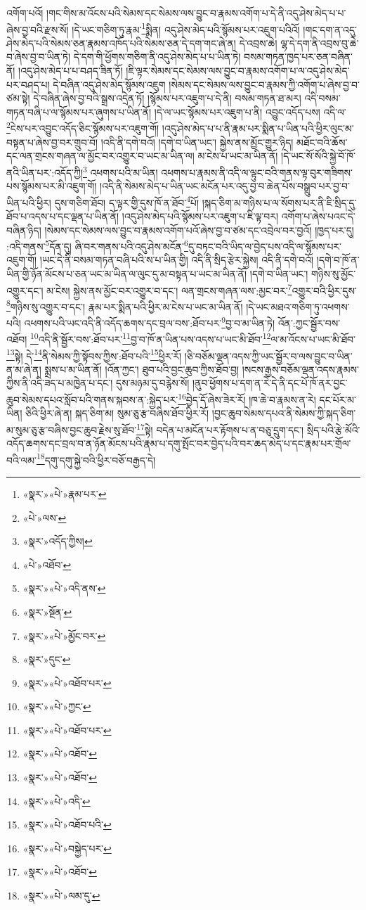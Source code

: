 འགོག་པའོ། །གང་གིས་མ་འོངས་པའི་སེམས་དང་སེམས་ལས་བྱུང་བ་རྣམས་འགོག་པ་དེ་ནི་འདུ་ཤེས་མེད་པ་པ་ཞེས་བྱ་བའི་རྫས་སོ། །དེ་ཡང་གཅིག་ཏུ་རྣམ་\footnote{«སྣར་»«པེ་»རྣམ་པར་}སྨིན། འདུ་ཤེས་མེད་པའི་སྙོམས་པར་འཇུག་པའིའོ། །གང་དག་ན་འདུ་ཤེས་མེད་པའི་སེམས་ཅན་རྣམས་འཁོད་པའི་སེམས་ཅན་དེ་དག་གང་ཞེ་ན། དེ་འབྲས་ཆེ། ལྷ་དེ་དག་ནི་འབྲས་བུ་ཆེ་བ་ཞེས་བྱ་བ་ཡིན་ཏེ། དེ་དག་གི་ཕྱོགས་གཅིག་ནི་འདུ་ཤེས་མེད་པ་པ་ཡིན་ཏེ། བསམ་གཏན་ཁྱད་པར་ཅན་བཞིན་ནོ། །འདུ་ཤེས་མེད་པ་པ་བཤད་ཟིན་ཏོ། །ཇི་ལྟར་སེམས་དང་སེམས་ལས་བྱུང་བ་རྣམས་འགོག་པ་ལ་འདུ་ཤེས་མེད་པར་བཤད་པ། དེ་བཞིན་འདུ་ཤེས་མེད་སྙོམས་འཇུག །སེམས་དང་སེམས་ལས་བྱུང་བ་རྣམས་ཀྱི་འགོག་པ་ཞེས་བྱ་བ་ཙམ་སྟེ། དེ་བཞིན་ཞེས་བྱ་བའི་སྒྲས་འདྲེན་ཏོ། །སྙོམས་པར་འཇུག་པ་དེ་ནི། བསམ་གཏན་ཐ་མར། འདི་བསམ་གཏན་བཞི་པ་ལ་སྙོམས་པར་ཞུགས་པ་ཡིན་ནོ། །དེ་ལ་ཡང་སྙོམས་པར་འཇུག་པ་ནི། འབྱུང་འདོད་པས། འདི་ལ་\footnote{«པེ་»ལས་}ངེས་པར་འབྱུང་འདོད་ཅིང་སྙོམས་པར་འཇུག་གོ། །འདུ་ཤེས་མེད་པ་པ་ནི་རྣམ་པར་སྨིན་པ་ཡིན་པའི་ཕྱིར་ལུང་མ་བསྟན་པ་ཞེས་བྱ་བར་གྲུབ་བོ། །འདི་ནི་དགེ་བའོ། །དགེ་བ་ཡིན་ཡང་། སྐྱེས་ནས་མྱོང་གྱུར་ཉིད། མཐོང་བའི་ཆོས་དང་ལན་གྲངས་གཞན་ལ་མྱོང་བར་འགྱུར་བ་ཡང་མ་ཡིན་ལ། མ་ངེས་པ་ཡང་མ་ཡིན་ནོ། །དེ་ཡང་སོ་སོའི་སྐྱེ་བོ་ཁོ་ནའི་ཡིན་པར་:འདོད་ཀྱི།\footnote{«སྣར་»འདོད་ཀྱིས།} འཕགས་པའི་མ་ཡིན། འཕགས་པ་རྣམས་ནི་འདི་ལ་ལྟུང་བའི་གནས་ལྟ་བུར་གཟིགས་པས་སྙོམས་པར་མི་འཇུག་གོ། །འདི་ནི་སེམས་མེད་པ་ཡིན་ཡང་མངོན་པར་འདུ་བྱ་བ་ཆེན་པོས་བསྒྲུབ་པར་བྱ་བ་ཡིན་པའི་ཕྱིར། དུས་གཅིག་ཐོབ། ད་ལྟར་གྱི་དུས་ཁོ་ན་ཐོབ་\footnote{«པེ་»འཐོབ་}པོ། །སྐད་ཅིག་མ་གཉིས་པ་ལ་སོགས་པར་ནི་ཇི་སྲིད་དུ་ཐོབ་པ་འདས་པ་དང་ལྡན་པ་ཡིན་ནོ། །འདུ་ཤེས་མེད་པའི་སྙོམས་པར་འཇུག་པ་ཇི་ལྟ་བར། འགོག་པ་ཞེས་པའང་དེ་བཞིན་ཉིད། །སེམས་དང་སེམས་ལས་བྱུང་བ་རྣམས་འགོག་པའོ་ཞེས་བྱ་བ་ཙམ་དང་འབྲེལ་བར་བྱའོ། །ཁྱད་པར་དུ། :འདི་གནས་\footnote{«སྣར་»«པེ་»འདི་ནས་}དོན་དུ། ཞི་བར་གནས་པའི་འདུ་ཤེས་མངོན་\footnote{«སྣར་»སྔོན་}དུ་བཏང་བའི་ཡིད་ལ་བྱེད་པས་འདི་ལ་སྙོམས་པར་འཇུག་གོ། །ཡང་དེ་ནི་བསམ་གཏན་བཞི་པའི་ས་པ་ཡིན་གྱི། འདི་ནི་སྲིད་རྩེར་སྐྱེས། འདི་ནི་དགེ་བའོ། །དགེ་བ་ཁོ་ན་ཡིན་གྱི་ཉོན་མོངས་པ་ཅན་ཡང་མ་ཡིན་ལ་ལུང་དུ་མ་བསྟན་པ་ཡང་མ་ཡིན་ནོ། །དགེ་བ་ཡིན་ཡང་། གཉིས་སུ་མྱོང་འགྱུར་དང་། མ་ངེས། སྐྱེས་ནས་མྱོང་བར་འགྱུར་བ་དང་། ལན་གྲངས་གཞན་ལས་:མྱང་བར་\footnote{«སྣར་»«པེ་»མྱོང་བར་}འགྱུར་བའི་ཕྱིར་དུས་\footnote{«སྣར་»དུང་}གཉིས་སུ་འགྱུར་བ་དང་། རྣམ་པར་སྨིན་པའི་ཕྱིར་མ་ངེས་པ་ཡང་མ་ཡིན་ནོ། །དེ་ཡང་མཐའ་གཅིག་ཏུ་འཕགས་པའི། འཕགས་པའི་ཡང་འདི་ནི་འདོད་ཆགས་དང་བྲལ་བས་:ཐོབ་པར་\footnote{«སྣར་»«པེ་»འཐོབ་པར་}བྱ་བ་མ་ཡིན་ཏེ། འོན་:ཀྱང་སྦྱོར་བས་འཐོབ། \footnote{«སྣར་»«པེ་»ཀྱང་}འདི་ནི་སྦྱོར་བས་:ཐོབ་པར་\footnote{«སྣར་»«པེ་»འཐོབ་པར་}བྱ་བ་ཁོ་ན་ཡིན་པས་འདས་པ་ཡང་མི་ཐོབ་\footnote{«སྣར་»«པེ་»འཐོབ་}ལ་མ་འོངས་པ་ཡང་མི་ཐོབ་\footnote{«སྣར་»«པེ་»འཐོབ་}སྟེ། དེ་\footnote{«སྣར་»«པེ་»འདི་}ནི་སེམས་ཀྱི་སྟོབས་ཀྱིས་:ཐོབ་པའི་\footnote{«སྣར་»«པེ་»འཐོབ་པའི་}ཕྱིར་རོ། །ཅི་བཅོམ་ལྡན་འདས་ཀྱི་ཡང་སྦྱོར་བ་ལས་བྱུང་བ་ཡིན་ན་མ་ཞེ་ན། སྨྲས་པ་མ་ཡིན་ནོ། །འོན་ཀྱང་། ཐུབ་པའི་བྱང་ཆུབ་ཀྱིས་ཐོབ་བྱ། །སངས་རྒྱས་བཅོམ་ལྡན་འདས་རྣམས་ཀྱིས་ནི་འདི་ཟད་པ་མཁྱེན་པ་དང་། དུས་མཉམ་དུ་བརྙེས་སོ། །ནུབ་ཕྱོགས་པ་དག་ན་རེ་དེ་ནི་དང་པོ་ཁོ་ནར་བྱང་ཆུབ་སེམས་དཔའ་སློབ་པའི་གནས་སྐབས་ན་:སྐྱེད་པར་\footnote{«སྣར་»«པེ་»བསྐྱེད་པར་}བྱེད་དོ་ཞེས་ཟེར་རོ། །ཁ་ཆེ་བ་རྣམས་ན་རེ། དང་པོར་མ་ཡིན། ཅིའི་ཕྱིར་ཞེ་ན། སྐད་ཅིག་མ། སུམ་ཅུ་རྩ་བཞིས་ཐོབ་ཕྱིར་རོ། །བྱང་ཆུབ་སེམས་དཔའ་ནི་སེམས་ཀྱི་སྐད་ཅིག་མ་སུམ་ཅུ་རྩ་བཞིས་བྱང་ཆུབ་རྗེས་སུ་ཐོབ་\footnote{«སྣར་»«པེ་»འཐོབ་}སྟེ། བདེན་པ་མངོན་པར་རྟོགས་པ་ན་བཅུ་དྲུག་དང་། སྲིད་པའི་རྩེ་མོའི་འདོད་ཆགས་དང་བྲལ་བ་ན་ཉོན་མོངས་པའི་རྣམ་པ་དགུ་སྤོང་བར་བྱེད་པའི་བར་ཆད་མེད་པ་དང་རྣམ་པར་གྲོལ་བའི་ལམ་\footnote{«སྣར་»«པེ་»ལམ་དུ་}དགུ་དགུ་སྐྱེ་བའི་ཕྱིར་བཅོ་བརྒྱད་དེ། 